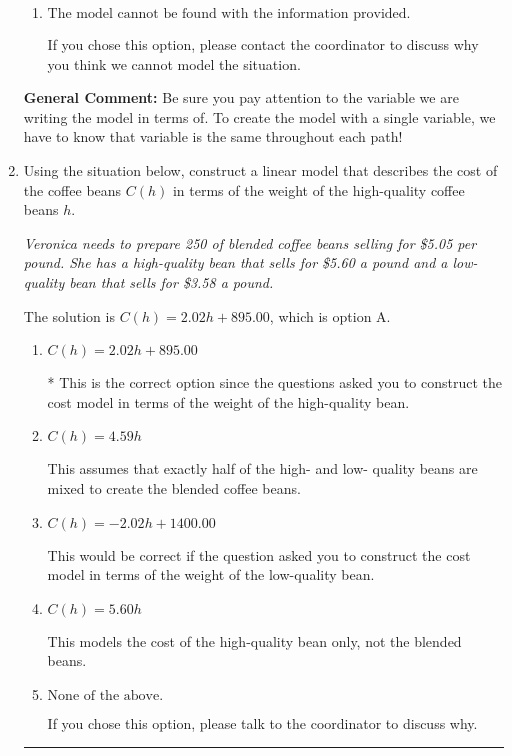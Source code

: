 \documentclass{extbook}[14pt]
\newcommand{\litem}[1]{\item #1

\rule{\textwidth}{0.4pt}}
\begin{document}
\begin{enumerate}
{\begin{enumerate}[label=\Alph*.]
* This is the correct option. Since the time spent on each path was equal, the distance of each path must be different. The model would be $0.250D_u + 0.111D_d + 0.143D_f$, where $D_u$ is distance traveling up the hill, $D_d$ is distance traveling down, and $D_f$ is distance traveling on a flat part.
\item \( \text{The model cannot be found with the information provided.} \)

If you chose this option, please contact the coordinator to discuss why you think we cannot model the situation.
\end{enumerate}

\textbf{General Comment:} Be sure you pay attention to the variable we are writing the model in terms of. To create the model with a single variable, we have to know that variable is the same throughout each path!
}
\litem{
Using the situation below, construct a linear model that describes the cost of the coffee beans $C(h)$ in terms of the weight of the high-quality coffee beans $h$.

\begin{center}
    \textit{ Veronica needs to prepare 250 of blended coffee beans selling for \$5.05 per pound. She has a high-quality bean that sells for \$5.60 a pound and a low-quality bean that sells for \$3.58 a pound. }
\end{center}
The solution is \( C(h) = 2.02 h + 895.00 \), which is option A.\begin{enumerate}[label=\Alph*.]
\item \( C(h) = 2.02 h + 895.00 \)

* This is the correct option since the questions asked you to construct the cost model in terms of the weight of the high-quality bean.
\item \( C(h) = 4.59 h \)

This assumes that exactly half of the high- and low- quality beans are mixed to create the blended coffee beans.
\item \( C(h) = -2.02 h + 1400.00 \)

This would be correct if the question asked you to construct the cost model in terms of the weight of the low-quality bean.
\item \( C(h) = 5.60 h \)

This models the cost of the high-quality bean only, not the blended beans.
\item \( \text{None of the above.} \)

If you chose this option, please talk to the coordinator to discuss why.
\end{enumerate}

}
\end{enumerate}
\end{document}
